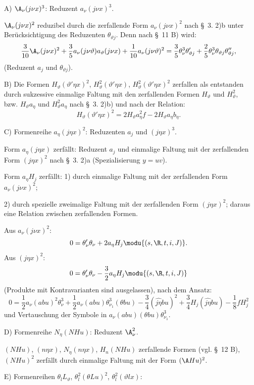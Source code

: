 \noindent A) $\A_\nu(j\nu x)^3$: Reduzent $a_\nu(j\nu x)^3$.

$\A_\nu(j\nu x)^2$ reduzibel durch die zerfallende Form $a_\nu(j\nu x)^2$ nach \S\ 3. 2)b unter Berücksichtigung des Reduzenten $\theta_{\vartheta j}$. Denn nach \S\ 11 B) wird:
\[
\frac3{10}\A_\nu(j\nu x)^2+\frac35a_\nu(j\nu\vartheta)a_\vartheta(j\nu x)
+\frac1{10}a_\nu(j\nu\vartheta)^2
=\frac35\theta_\nu^3\theta_{\vartheta j}'+\frac25\theta_\nu^3\theta_{\vartheta j}\theta_{\vartheta j}'',
\]
(Reduzent $a_j$ und $\theta_{\vartheta j}$).

\noindent B) Die Formen $H_\vartheta(\vartheta'\eta x)^2$, $H_\vartheta^2(\vartheta'\eta x)$, $H_\vartheta^2(\vartheta'\eta x)^2$ zerfallen als entstanden durch sukzessive einmalige Faltung mit den zerfallenden Formen $H_\vartheta$ und $H_\vartheta^2$, bzw. $H_\vartheta a_\eta$ und $H_\vartheta^2a_\eta$ nach \S\ 3. 2)b) und nach der Relation:
\[
H_\vartheta(\vartheta'\eta x)^2=2H_\vartheta a_\eta^2f-2H_\vartheta a_\eta b_\eta.
\]

\noindent C) Formenreihe $a_\eta(j\eta x)^2$: Reduzenten $a_j$ und $(j\eta x)^3$.

Form $a_\eta(j\eta x)$ zerfällt: Reduzent $a_j$ und einmalige Faltung mit der zerfallenden Form $(j\eta x)^2$ nach \S\ 3. 2)a (Spezialisierung $y=uv$).

Form $a_\eta H_j$ zerfällt: 1) durch einmalige Faltung mit der zerfallenden Form $a_\nu(j\nu x)^2$;

2) durch spezielle zweimalige Faltung mit der zerfallenden Form $(j\eta x)^2$; daraus eine Relation zwischen zerfallenden Formen.

Aus $a_\nu(j\nu x)^2$:
\[
0=\theta_\nu'\theta_\nu+2a_\eta H_j\modu{(s,\R,t,i,J)}.
\]
Aus $(j\eta x)^2$:
\[
0=\theta_\nu'\theta_\nu-\frac32a_\eta H_j\modu{(s,\R,t,i,J)}
\]
(Produkte mit Kontravarianten sind ausgelassen), nach dem Ansatz:
\[
0=\frac12a_\nu(abu)^2\theta_\nu^3
+\frac12a_\nu(abu)\theta_{\nu_1}^3(\theta bu)
-\frac34(\widehat{j\eta}bu)^2+\frac34H_j(\widehat{j\eta}bu)
-\frac18fH_j^2
\]
und Vertauschung der Symbole in $a_\nu(abu)(\theta bu)\theta_{\nu_1}^3$.

\noindent D) Formenreihe $N_\eta(NHu)$: Reduzent $\A_\nu^2$.

$(NHu)$, $(n\eta x)$, $N_\eta(n\eta x)$, $H_n(NHu)$ zerfallende Formen (vgl. \S\ 12 B), $(NHu)^2$ zerfällt durch einmalige Faltung mit der Form $(\A Hu)^2$.

\noindent E) Formenreihen $\theta_lL_\vartheta$, $\theta_l^2(\theta Lu)^2$, $\theta_l^2(\vartheta lx)$:

